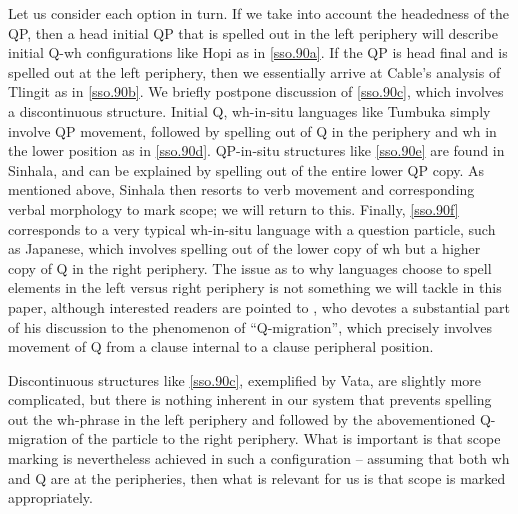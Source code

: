 \documentclass[11pt]{article}
\begin{document}
Let us consider each option in turn. If we take into account the headedness of the QP, then a head initial QP that is spelled out in the left periphery will describe initial Q-wh configurations like Hopi as in \ref{sso.90a}. If the QP is head final and is spelled out at the left periphery, then we essentially arrive at Cable's \citeyear{cable:2007} analysis of Tlingit as in \ref{sso.90b}. We briefly postpone discussion of \ref{sso.90c}, which involves a discontinuous structure. Initial Q, wh-in-situ languages like Tumbuka simply involve QP movement, followed by spelling out of Q in the periphery and wh in the lower position as in \ref{sso.90d}. QP-in-situ structures like \ref{sso.90e} are found in Sinhala, and can be explained by spelling out of the entire lower QP copy. As mentioned above, Sinhala then resorts to verb movement and corresponding verbal morphology to mark scope; we will return to this. Finally, \ref{sso.90f} corresponds to a very typical wh-in-situ language with a question particle, such as Japanese, which involves spelling out of the lower copy of wh but a higher copy of Q in the right periphery. The issue as to why languages choose to spell elements in the left versus right periphery is not something we will tackle in this paper, although interested readers are pointed to \cite{hagstrom:1998}, who devotes a substantial part of his discussion to the phenomenon of ``Q-migration'', which precisely involves movement of Q from a clause internal to a clause peripheral position.

Discontinuous structures like \ref{sso.90c}, exemplified by Vata, are slightly more complicated, but there is nothing inherent in our system that prevents spelling out the wh-phrase in the left periphery and followed by the abovementioned Q-migration of the particle to the right periphery. What is important is that scope marking is nevertheless achieved in such a configuration -- assuming that both wh and Q are at the peripheries, then what is relevant for us is that scope is marked appropriately.
\end{document}
